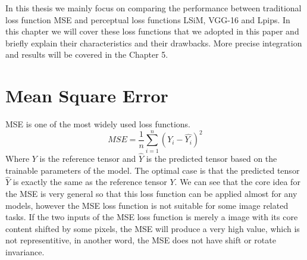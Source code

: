 \documentclass[a4paper,12pt,twoside]{report}
\begin{document}
In this thesis we mainly focus on comparing the performance between traditional loss function MSE and perceptual loss functions LSiM, VGG-16 and Lpips. In this chapter we will cover these loss functions that we adopted in this paper and briefly explain their characteristics and their drawbacks. More precise integration and results will be covered in the Chapter 5. 

\section{Mean Square Error}

MSE is one of the most widely used loss functions.
\begin{equation}
{MSE}=\frac{1}{n}\sum_{i=1}^n(Y_i-\hat{Y_i})^2
\end{equation}
Where ${Y}$ is the reference tensor and $\hat{Y}$ is the predicted tensor based on the trainable parameters of the model. The optimal case is that the predicted tensor $\hat{Y}$ is exactly the same as the reference tensor ${Y}$. We can see that the core idea for the MSE is very general so that this loss function can be applied almost for any models, however the MSE loss function is not suitable for some image related tasks. If the two inputs of the MSE loss function is merely a image with its core content shifted by some pixels, the MSE will produce a very high value, which is not representitive, in another word, the MSE does not have shift or rotate invariance. 
\end{document}

